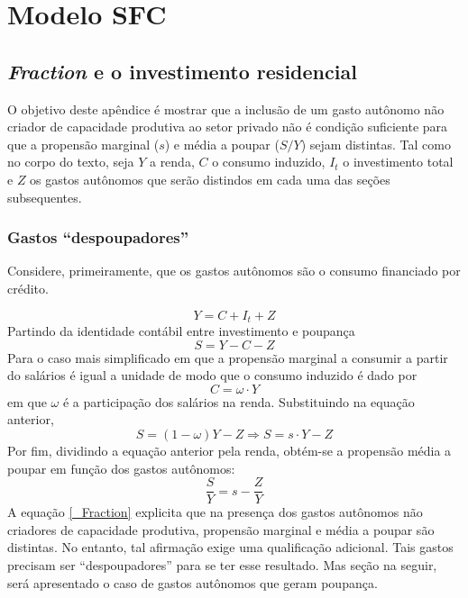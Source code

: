\titleformat{\chapter}[display]{\normalfont\huge}{\appendixname{} \thechapter}{20pt}{\bfseries\huge}
\chapter{Modelo SFC}
\label{Append_Fraction}


\section{\textit{Fraction} e o investimento residencial}

O objetivo deste apêndice é mostrar que a inclusão de um gasto autônomo não criador de capacidade produtiva ao setor privado não é condição suficiente para que a propensão marginal ($s$) e média a poupar ($S/Y$) sejam distintas. Tal como no corpo do texto, seja $Y$ a renda, $C$ o consumo induzido, $I_t$ o investimento total e $Z$ os gastos autônomos que serão distindos em cada uma das seções subsequentes.

\subsection{Gastos ``despoupadores''}

Considere, primeiramente, que os gastos autônomos são o consumo financiado por crédito.

$$
Y = C + I_t + Z
$$
Partindo da identidade contábil entre investimento e poupança
$$
S = Y - C - Z
$$
Para o caso mais simplificado em que a propensão marginal a consumir a partir do salários é igual a unidade de modo que o consumo induzido é dado por
$$
C = \omega\cdot Y
$$
em que $\omega$ é a participação dos salários na renda. Substituindo na equação anterior,
$$
S = (1- \omega)Y - Z \Rightarrow S = s\cdot Y - Z
$$
Por fim, dividindo a equação anterior pela renda, obtém-se a propensão média a poupar em função dos gastos autônomos:
\begin{equation}
\label{_Fraction}
    \frac{S}{Y} = s - \frac{Z}{Y}
\end{equation}
A equação \ref{_Fraction} explicita que na presença dos gastos autônomos não criadores de capacidade produtiva, propensão marginal e média a poupar são distintas. No entanto, tal afirmação exige uma qualificação adicional. Tais gastos precisam ser ``despoupadores'' para se ter esse resultado. Mas seção na seguir, será apresentado o caso de gastos autônomos que geram poupança. 

